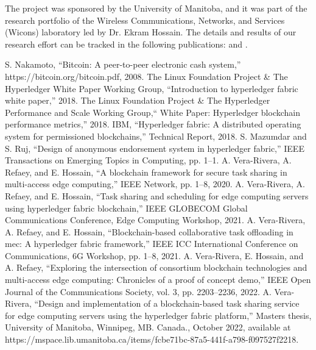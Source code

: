 \documentclass[conference]{IEEEtran}
\begin{document}
The project was sponsored by the University of Manitoba, and it was part of the research portfolio of the Wireless Communications, Networks, and Services (Wicons) laboratory led by Dr. Ekram Hossain. The details and results of our research effort can be tracked in the following publications: \cite{06} \cite{07} \cite{08} \cite{09} and \cite{10}.

\begin{thebibliography}{2}
 S. Nakamoto, “Bitcoin: A peer-to-peer electronic cash system,” https://bitcoin.org/bitcoin.pdf, 2008.
 The Linux Foundation Project \& The Hyperledger White Paper Working Group, “Introduction to hyperledger fabric white paper,” 2018.
The Linux Foundation Project \& The Hyperledger Performance and Scale Working Group,“ White Paper: Hyperledger blockchain performance metrics,” 2018.
 IBM, “Hyperledger fabric: A distributed operating system for permissioned blockchains,” Technical Report, 2018.
 S. Mazumdar and S. Ruj, “Design of anonymous endorsement system in hyperledger fabric,” IEEE Transactions on Emerging Topics in Computing, pp. 1–1.
 A. Vera-Rivera, A. Refaey, and E. Hossain, “A blockchain framework for secure task sharing in multi-access edge computing,” IEEE Network, pp. 1–8, 2020.
 A. Vera-Rivera, A. Refaey, and E. Hossain, “Task sharing and scheduling for edge computing servers using hyperledger fabric blockchain,” IEEE GLOBECOM Global Communications Conference, Edge Computing Workshop, 2021.
 A. Vera-Rivera, A. Refaey, and E. Hossain, “Blockchain-based collaborative task offloading in mec: A hyperledger fabric framework,” IEEE ICC International Conference on Communications, 6G Workshop, pp. 1–8, 2021.
 A. Vera-Rivera, E. Hossain, and A. Refaey, “Exploring the intersection of consortium blockchain technologies and multi-access edge computing: Chronicles of a proof of concept demo,” IEEE Open Journal of the Communications Society, vol. 3, pp. 2203–2236, 2022.
 A. Vera-Rivera, “Design and implementation of a blockchain-based task sharing service for edge computing servers using the hyperledger fabric platform,” Masters thesis, University of Manitoba, Winnipeg, MB. Canada., October 2022, available at https://mspace.lib.umanitoba.ca/items/fcbe71bc-87a5-441f-a798-f097527f2218.
\end{thebibliography}

\printacronyms
\end{document}
